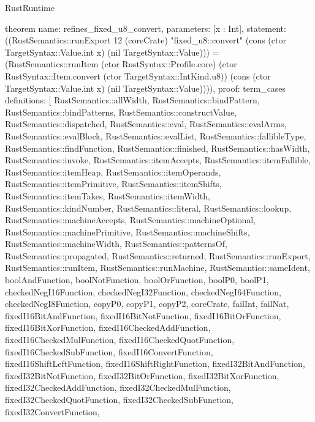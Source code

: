 \begin{lexlean}{RustRuntime}
\begin{semanticmodule}
theorem{
  name: refines_fixed_u8_convert,
  parameters: [x : Int],
  statement: ((RustSemantics::runExport 12 (coreCrate) "fixed_u8::convert" (cons (ctor TargetSyntax::Value.int x) (nil TargetSyntax::Value))) = (RustSemantics::runItem (ctor RustSyntax::Profile.core) (ctor RustSyntax::Item.convert (ctor TargetSyntax::IntKind.u8)) (cons (ctor TargetSyntax::Value.int x) (nil TargetSyntax::Value)))),
  proof: term_cases{
    definitions: [
      RustSemantics::allWidth,
      RustSemantics::bindPattern,
      RustSemantics::bindPatterns,
      RustSemantics::constructValue,
      RustSemantics::dispatched,
      RustSemantics::eval,
      RustSemantics::evalArms,
      RustSemantics::evalBlock,
      RustSemantics::evalList,
      RustSemantics::fallibleType,
      RustSemantics::findFunction,
      RustSemantics::finished,
      RustSemantics::hasWidth,
      RustSemantics::invoke,
      RustSemantics::itemAccepts,
      RustSemantics::itemFallible,
      RustSemantics::itemHeap,
      RustSemantics::itemOperands,
      RustSemantics::itemPrimitive,
      RustSemantics::itemShifts,
      RustSemantics::itemTakes,
      RustSemantics::itemWidth,
      RustSemantics::kindNumber,
      RustSemantics::literal,
      RustSemantics::lookup,
      RustSemantics::machineAccepts,
      RustSemantics::machineOptional,
      RustSemantics::machinePrimitive,
      RustSemantics::machineShifts,
      RustSemantics::machineWidth,
      RustSemantics::patternsOf,
      RustSemantics::propagated,
      RustSemantics::returned,
      RustSemantics::runExport,
      RustSemantics::runItem,
      RustSemantics::runMachine,
      RustSemantics::sameIdent,
      boolAndFunction,
      boolNotFunction,
      boolOrFunction,
      boolP0,
      boolP1,
      checkedNegI16Function,
      checkedNegI32Function,
      checkedNegI64Function,
      checkedNegI8Function,
      copyP0,
      copyP1,
      copyP2,
      coreCrate,
      failInt,
      failNat,
      fixedI16BitAndFunction,
      fixedI16BitNotFunction,
      fixedI16BitOrFunction,
      fixedI16BitXorFunction,
      fixedI16CheckedAddFunction,
      fixedI16CheckedMulFunction,
      fixedI16CheckedQuotFunction,
      fixedI16CheckedSubFunction,
      fixedI16ConvertFunction,
      fixedI16ShiftLeftFunction,
      fixedI16ShiftRightFunction,
      fixedI32BitAndFunction,
      fixedI32BitNotFunction,
      fixedI32BitOrFunction,
      fixedI32BitXorFunction,
      fixedI32CheckedAddFunction,
      fixedI32CheckedMulFunction,
      fixedI32CheckedQuotFunction,
      fixedI32CheckedSubFunction,
      fixedI32ConvertFunction,
}}
\end{semanticmodule}
\end{lexlean}
